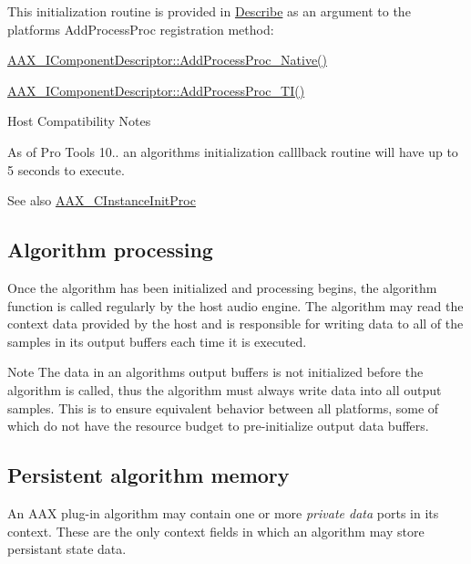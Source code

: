  This initialization routine is provided in \hyperlink{a00326}{Describe} as an argument to the platform\textquotesingle{}s {\ttfamily Add\+Process\+Proc} registration method\+:

 \begin{DoxyItemize}
\item \hyperlink{a00088_a1c069508cf54a523905c8160ebf628ad}{A\+A\+X\+\_\+\+I\+Component\+Descriptor\+::\+Add\+Process\+Proc\+\_\+\+Native()} \item \hyperlink{a00088_aa8443e720e48046444a2e9f712f0864b}{A\+A\+X\+\_\+\+I\+Component\+Descriptor\+::\+Add\+Process\+Proc\+\_\+\+T\+I()}\end{DoxyItemize}
\begin{DoxyRefDesc}{Host Compatibility Notes}
\item[\hyperlink{a00380__compatibility_notes000002}{Host Compatibility Notes}]As of Pro Tools 10.. an algorithm\textquotesingle{}s initialization calllback routine will have up to 5 seconds to execute.\end{DoxyRefDesc}


 \begin{DoxySeeAlso}{See also}
\hyperlink{a00163_a3963a850079d3186e08c97a1a4d0ef1c}{A\+A\+X\+\_\+\+C\+Instance\+Init\+Proc}
\end{DoxySeeAlso}


 \hypertarget{a00327_alg_processing}{}\subsection{Algorithm processing}\label{a00327_alg_processing}
 Once the algorithm has been initialized and processing begins, the algorithm function is called regularly by the host audio engine. The algorithm may read the context data provided by the host and is responsible for writing data to all of the samples in its output buffers each time it is executed.

 \begin{DoxyNote}{Note}
The data in an algorithm\textquotesingle{}s output buffers is not initialized before the algorithm is called, thus the algorithm must always write data into all output samples. This is to ensure equivalent behavior between all platforms, some of which do not have the resource budget to pre-\/initialize output data buffers.
\end{DoxyNote}


 \hypertarget{a00327_alg_pd}{}\subsection{Persistent algorithm memory}\label{a00327_alg_pd}
 An A\+A\+X plug-\/in algorithm may contain one or more {\itshape private data} ports in its context. These are the only context fields in which an algorithm may store persistant state data.

